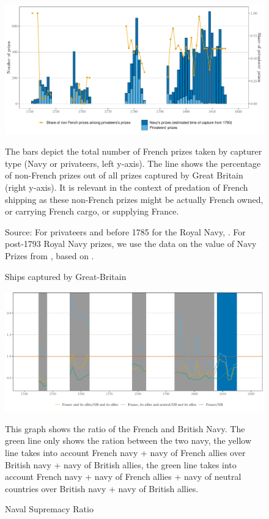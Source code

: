 \documentclass[12pt,a4paper,notitlepage,english]{article}
\newcommand{\fontsmall}{\fontsize{10pt}{12pt}\selectfont}
\newcommand{\source}[1]{\caption*{\footnotesize Source: {#1}} }
\begin{document}
\begin{appendix}
\begin{figure}[h!]
\caption{Ships captured by Great-Britain}
\label{Prizes}
\centering
\includegraphics[scale=0.2]{Prizes}
\begin{minipage}{18cm}
\begin{flushleft}
\fontsmall 
The bars depict the total number of French prizes taken by capturer type (Navy or privateers, left y-axis). The line shows the percentage of non-French prizes out of all prizes captured by Great Britain (right y-axis). It is relevant in the context of predation of French shipping as these non-French prizes might be actually French owned, or carrying French cargo, or supplying France. 
\source{For privateers and before 1785 for the Royal Navy, \cite{Starkey1990,Hillmann2011}. For post-1793 Royal Navy prizes, we use the data on the value of Navy Prizes from \cite{Benjamin2009}, based on \cite{Hill1998}.}
\end{flushleft}
\end{minipage}
\end{figure}



\begin{figure}[h!]
\caption{Naval Supremacy Ratio}
\label{naval_supremacy_ratios}
\centering
\includegraphics[scale=.18]{naval_supremacy_ratio}
\begin{minipage}{18cm}
\begin{flushleft}
\fontsmall 
This graph shows the ratio of the French and British Navy. The green line only shows the ration between the two navy, the yellow line takes into account French navy + navy of French allies over British navy + navy of British allies, the green line takes into account French navy + navy of French allies + navy of neutral countries over British navy + navy of British allies. 
\end{flushleft}
\end{minipage}
\end{figure}




\end{appendix}
\end{document}
